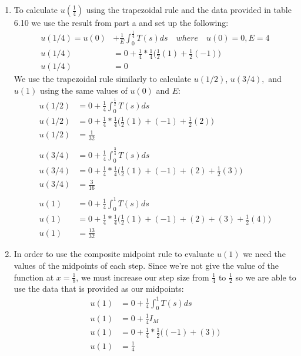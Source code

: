 \documentclass[11pt,a4paper]{article}
\begin{document}
\begin{itemize}
\begin{enumerate} [label={\alph*)}]
					\item To calculate $u(\frac{1}{4})$ using the trapezoidal rule and the data provided in table 6.10 we use the result from part a and set up the following:
					\begin{align*}
						u(1/4) = u(0) &+ \frac{1}{E} \int_{0}^{\frac{1}{4}} T(s)ds \quad where \quad u(0)=0,E=4\\
						u(1/4) &= 0 + \frac{1}{4}* \frac{1}{4}\Big(\frac{1}{2}(1)+\frac{1}{2}(-1)\Big) \\
						u(1/4) &= 0
					\end{align*}
					We use the trapezoidal rule similarly to calculate $u(1/2)$, $u(3/4),$ and $u(1)$ using the same values of $u(0)$ and $E$:
					\begin{align*}
						u(1/2) &= 0 + \frac{1}{4} \int_{0}^{\frac{1}{2}} T(s)ds\\
						u(1/2) &= 0 + \frac{1}{4}* \frac{1}{4}\Big(\frac{1}{2}(1)+(-1)+\frac{1}{2}(2)\Big) \\
						u(1/2) &= \frac{1}{32}\\
						\\
						u(3/4) &= 0 + \frac{1}{4} \int_{0}^{\frac{3}{4}} T(s)ds\\
						u(3/4) &= 0 + \frac{1}{4}* \frac{1}{4}\Big(\frac{1}{2}(1)+(-1)+(2)+\frac{1}{2}(3)\Big) \\
						u(3/4) &= \frac{3}{16}\\
						\\
						u(1) &= 0 + \frac{1}{4} \int_{0}^{1} T(s)ds\\
						u(1) &= 0 + \frac{1}{4}* \frac{1}{4}\Big(\frac{1}{2}(1)+(-1)+(2)+(3)+\frac{1}{2}(4)\Big) \\
						u(1) &= \frac{13}{32}
					\end{align*}
					\item In order to use the composite midpoint rule to evaluate $u(1)$ we need the values of the midpoints of each step. Since we're not give the value of the function at $x=\frac{1}{8}$, we must increase our step size from $\frac{1}{4}$ to $\frac{1}{2}$ so we are able to use the data that is provided as our midpoints: 
					\begin{align*}
						u(1) &= 0 + \frac{1}{4} \int_{0}^{1} T(s)ds\\
						u(1) &= 0 + \frac{1}{4} I_M \\
						u(1) &= 0 + \frac{1}{4}* \frac{1}{2}\Big((-1)+(3)\Big)\\
						u(1) &= \frac{1}{4}
					\end{align*}

\end{enumerate}
\end{itemize}
\end{document}
